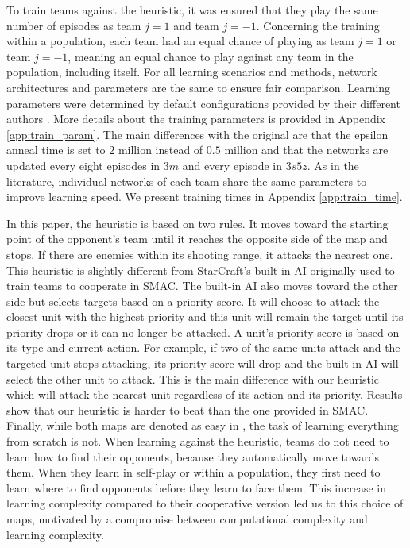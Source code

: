 To train teams against the heuristic, it was ensured that they play the same number of episodes as team $j=1$ and team $j=-1$.
Concerning the training within a population, each team had an equal chance of playing as team $j=1$ or team $j=-1$, meaning an equal chance to play against any team in the population, including itself.
For all learning scenarios and methods, network architectures and parameters are the same to ensure fair comparison.
Learning parameters were determined by default configurations provided by their different authors \citep{Rashid2018,Mahajan2019MAVEN:Exploration,leroy2020qvmix}.
More details about the training parameters is provided in Appendix \ref{app:train_param}.
The main differences with the original are that the epsilon anneal time is set to $2$ million instead of $0.5$ million and that the networks are updated every eight episodes in $3m$ and every episode in $3s5z$.
As in the literature, individual networks of each team share the same parameters to improve learning speed. We present training times in Appendix \ref{app:train_time}.

In this paper, the heuristic is based on two rules.
It moves toward the starting point of the opponent's team until it reaches the opposite side of the map and stops.
If there are enemies within its shooting range, it attacks the nearest one.
This heuristic is slightly different from StarCraft's built-in AI originally used to train teams to cooperate in SMAC.
The built-in AI also moves toward the other side but selects targets based on a priority score.
It will choose to attack the closest unit with the highest priority and this unit will remain the target until its priority drops or it can no longer be attacked.
A unit's priority score is based on its type and current action.
For example, if two of the same units attack and the targeted unit stops attacking, its priority score will drop and the built-in AI will select the other unit to attack.
This is the main difference with our heuristic which will attack the nearest unit regardless of its action and its priority.
Results show that our heuristic is harder to beat than the one provided in SMAC.
Finally, while both maps are denoted as easy in \citep{samvelyan2019starcraft}, the task of learning everything from scratch is not.
When learning against the heuristic, teams do not need to learn how to find their opponents, because they automatically move towards them.
When they learn in self-play or within a population, they first need to learn where to find opponents before they learn to face them.
This increase in learning complexity compared to their cooperative version led us to this choice of maps, motivated by a compromise between computational complexity and learning complexity.

